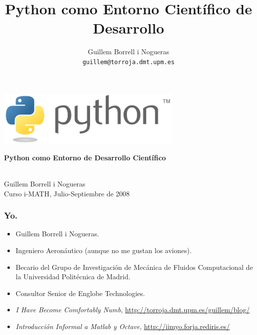 \documentclass{beamer}
\title{Python como Entorno Científico de Desarrollo}
\author{
  Guillem Borrell i Nogueras\\
  \texttt{guillem@torroja.dmt.upm.es}\\
}
\begin{document}

\begin{frame}
  \begin{center}
    \includegraphics[width=9cm]{files/python-logo-generic.pdf}\\
    \begin{large}
      \textbf{Python como Entorno de Desarrollo Científico}
    \end{large}\\

    Guillem Borrell i Nogueras\\

    Curso i-MATH, Julio-Septiembre de 2008
  \end{center}

\end{frame}


\begin{frame}
  \frametitle{Yo.}
  \begin{itemize}
  \item Guillem Borrell i Nogueras.
  \item Ingeniero Aeronáutico (aunque no me gustan los aviones).
  \item Becario del Grupo de Investigación de Mecánica de Fluidos
    Computacional de la Universidad Politécnica de Madrid.
  \item Consultor Senior de Englobe Technologies.
  \item \textit{I Have Become Comfortably Numb},
    \url{http://torroja.dmt.upm.es/guillem/blog/}
  \item \textit{Introducción Informal a Matlab y Octave},
    \url{http://iimyo.forja.rediris.es/}
  \end{itemize}
\end{frame}
\end{document}
